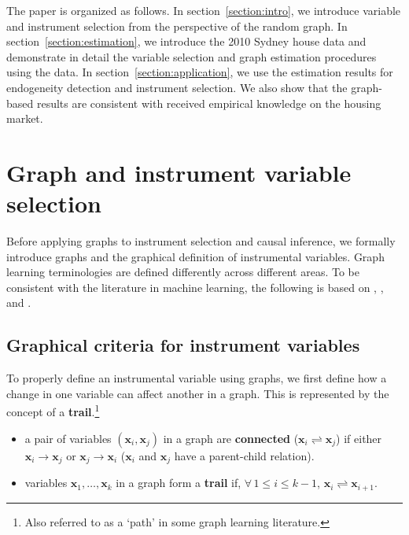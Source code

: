 \documentclass[11pt,review,authoryear]{elsarticle}
\begin{document}
The paper is organized as follows. In section~\ref{section:intro}, we introduce variable and instrument selection from the perspective of the random graph. In section~\ref{section:estimation}, we introduce the 2010 Sydney house data and demonstrate in detail the variable selection and graph estimation procedures using the data. In section~\ref{section:application}, we use the estimation results for endogeneity detection and instrument selection. We also show that the graph-based results are consistent with received empirical knowledge on the housing market.


\section{Graph and instrument variable selection\label{section:intro}}

Before applying graphs to instrument selection and causal inference, we formally introduce graphs and the graphical definition of instrumental variables. Graph learning terminologies are defined differently across different areas. To be consistent with the literature in machine learning, the following is based on \citet{spirtes2000causation}, \citet{pearl2009causality}, and \citet{koller2009probabilistic}.

\subsection{Graphical criteria for instrument variables}

To properly define an instrumental variable using graphs, we first define how a change in one variable can affect another in a graph. This is represented by the concept of a \textbf{trail}.\footnote{Also referred to as a `path' in some graph learning literature.}

\begin{definition}
  \label{def:trail}
\end{definition}
%
\begin{itemize}
  \item a pair of variables $\left( \mathbf{x}_i, \mathbf{x}_j \right)$ in a graph are \textbf{connected} ($\mathbf{x}_i \rightleftharpoons \mathbf{x}_j$) if either $\mathbf{x}_i \rightarrow \mathbf{x}_j$ or $\mathbf{x}_j \rightarrow \mathbf{x}_i$ ($\mathbf{x}_i$ and $\mathbf{x}_j$ have a parent-child relation).
  \item variables $\mathbf{x}_1, \ldots, \mathbf{x}_k$ in a graph form a \textbf{trail} if, $\forall\, 1 \leqslant i \leqslant k-1$, $\mathbf{x}_i \rightleftharpoons \mathbf{x}_{i+1}$.
\end{itemize}
\end{document}

